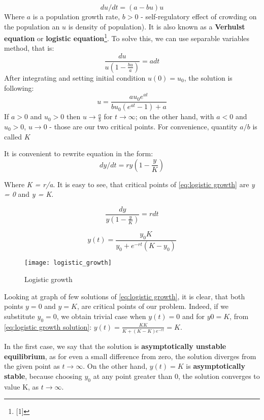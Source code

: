 \begin{equation}
du/dt = (a - bu)u
\end{equation}
Where $a$ is a population growth rate, $b > 0$ - self-regulatory effect of crowding on the population an $u$ is
density of population). It is also known as a \textbf{Verhulst equation} or \textbf{logistic equation}\footnote{[1]}. To solve this, we can use separable variables method, that is:
\begin{equation}
\frac{du}{u(1 - \frac{bu}{a})} = adt
\end{equation}
After integrating and setting initial condition $u(0) = u_0$, the solution is following:
\begin{equation}
u = \frac{au_0e^{at}}{bu_0(e^{at}-1) + a}
\end{equation}
If $a > 0$ and $u_0 > 0$ then $u \rightarrow \frac{a}{b}$ for $t \rightarrow \infty$; on the other hand, with $a <0$ and $u_0 > 0$, $u \rightarrow 0$ - those are our two critical points. For convenience, quantity $a/b$ is called $K$

It is convenient to rewrite equation in the form:
\begin{equation} \label{eq:logistic growth}
dy/dt = ry(1 - \frac{y}{K})
\end{equation}

Where \textit{K = r/a}. It is easy to see, that critical points of \ref{eq:logistic growth} are \textit{y = 0} and \textit{y = K}. 

\begin{equation}
\frac{dy}{y(1 - \frac{y}{K})} = rdt
\end{equation}

\begin{equation} \label{eq:logistic growth solution}
y(t) = \frac{y_0 K}{y_0 + e^{-rt}(K - y_0)}
\end{equation}

\begin{figure}[h]
\centering
\texttt{[image: logistic\_growth]}
\caption{Logistic growth}
\label{fig:logistic growth}
\end{figure}


Looking at graph of few solutions of \ref{eq:logistic growth}, it is clear, that both points $y = 0$ and $y = K$, are critical points of our problem. Indeed, if we substitute $y_0 = 0$, we obtain trivial case when $y(t) = 0$ and for $y0 = K$, from \ref{eq:logistic growth solution}: $y(t) = \frac{K K}{K + (K-K)e^{-rt}} = K$.

In the first case, we say that the solution is \textbf{asymptotically unstable equilibrium}, as for even a small difference from zero, the solution diverges from the given point as $t \rightarrow \infty$. On the other hand, $y(t) = K$ is \textbf{asymptotically stable}, because choosing $y_0$ at any point greater than 0, the solution converges to value K, as $t \rightarrow \infty$.

